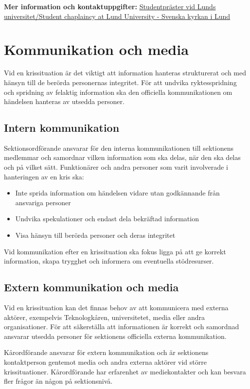 \documentclass[pdfbookmarks,a4paper,11pt]{article}
\begin{document}
\textbf{Mer information och kontaktuppgifter:} \href{https://www.svenskakyrkan.se/lund/studentprasterna}{Studentpräster vid Lunds universitet/Student chaplaincy at Lund University - Svenska kyrkan i Lund}

\section{Kommunikation och media}

Vid en krissituation är det viktigt att information hanteras strukturerat och med hänsyn till de berörda personernas integritet. För att undvika ryktesspridning och spridning av felaktig information ska den officiella kommunikationen om händelsen hanteras av utsedda personer.

\subsection{Intern kommunikation}

Sektionsordförande ansvarar för den interna kommunikationen till sektionens medlemmar och samordnar vilken information som ska delas, när den ska delas och på vilket sätt. Funktionärer och andra personer som varit involverade i hanteringen av en kris ska:

\begin{itemize}
    \item Inte sprida information om händelsen vidare utan godkännande från ansvariga personer
    \item Undvika spekulationer och endast dela bekräftad information
    \item Visa hänsyn till berörda personer och deras integritet
\end{itemize}

Vid kommunikation efter en krissituation ska fokus ligga på att ge korrekt information, skapa trygghet och informera om eventuella stödresurser.

\subsection{Extern kommunikation och media}

Vid en krissituation kan det finnas behov av att kommunicera med externa aktörer, exempelvis Teknologkåren, universitetet, media eller andra organisationer. För att säkerställa att informationen är korrekt och samordnad ansvarar utsedda personer för sektionens officiella externa kommunikation.

Kårordförande ansvarar för extern kommunikation och är sektionens kontaktperson gentemot media och andra externa aktörer vid större krissituationer. Kårordförande har erfarenhet av mediekontakter och kan besvara fler frågor än någon på sektionsnivå.
\end{document}
